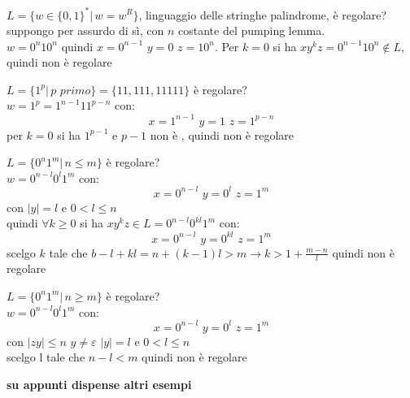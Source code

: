 	\begin{example}
		$L=\{w\in\{0,1\}^*|\, w=w^R\}$, linguaggio delle stringhe palindrome, è regolare?\\
		suppongo per assurdo di sì, con $n$ costante del pumping lemma.\\
		$w=0^n10^n$ quindi $x=0^{n-1}\,\,y=0\,\,z=10^n$.
		Per $k=0$ si ha $xy^kz=0^{n-1}10^n\not\in L$, quindi non è regolare
	\end{example}
	\begin{example}
		$L=\{1^p|\, p\,\,primo\}=\{11,111,11111\}$ è regolare?\\
		$w=1^p=1^{n-1}11^{p-n}$ con:
		$$x=1^{n-1}\,\,y=1\,\,z=1^{p-n}$$
		per $k=0$ si ha $1^{p-1}$ e $p-1$ non è , quindi non è regolare
	\end{example}
	\begin{example}
		$L=\{0^n1^m|\, n\leq m\}$ è regolare?\\
		$w=0^{n-l}0^l1^{m}$ con:
		$$x=0^{n-l}\,\,y=0^l\,\,z=1^{m}$$
		con $|y|=l$ e $0<l\leq n$\\
		quindi $\forall k\geq 0$ si ha $xy^kz\in L=0^{n-l}0^{kl}1^{m}$ con:
		$$x=0^{n-l}\,\,y=0^{kl}\,\,z=1^{m}$$
		scelgo $k$ tale che $b-l+kl=n+(k-1)l>m\to k> 1+\frac{m-n}{l}$ quindi non è regolare
	\end{example}
	\begin{example}
		$L=\{0^n1^m|\, n\geq m\}$ è regolare?\\
		$w=0^{n-l}0^l1^{m}$ con:
		$$x=0^{n-l}\,\,y=0^l\,\,z=1^{m}$$
		con $|zy|\leq n\,\,y\neq\varepsilon\,\,|y|=l$ e $0<l\leq n$\\
		scelgo l tale che $n-l<m$ quindi non è regolare
	\end{example}
	\textbf{su appunti dispense altri esempi}

